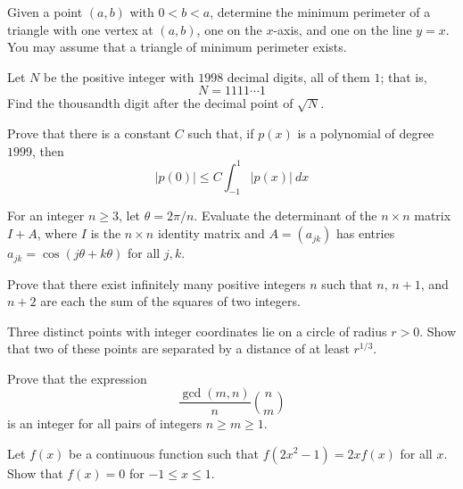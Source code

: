 \documentclass[12pt]{article}
\begin{document}
    \begin{exercise}[1998 B2]
        Given a point $(a, b)$ with $0 < b < a$, determine the minimum perimeter of a triangle with one vertex at $(a, b)$, one on the $x$-axis, and one on the line $y = x$. You may assume that a triangle of minimum perimeter exists.
    \end{exercise}

    \begin{exercise}[1998 B5]
        Let $N$ be the positive integer with $1998$ decimal digits, all of them $1$; that is, \[N=1111\cdots 1\] Find the thousandth digit after the decimal point of $\sqrt{N}$.
    \end{exercise}

    \begin{exercise}[1999 A5]
        Prove that there is a constant $C$ such that, if $p(x)$ is a polynomial of degree $1999$, then
        \[|p(0)|\leqslant C\int_{-1}^1 |p(x)|\ dx\]
    \end{exercise}

    \begin{exercise}[1999 B5]
        For an integer $n\geqslant 3$, let $\theta = 2\pi / n$. Evaluate the determinant of the $n\times n$ matrix $I+A$, where $I$ is the $n\times n$ identity matrix and $A=(a_{jk})$ has entries $a_{jk} = \cos(j\theta+k\theta)$ for all $j,k$. 
    \end{exercise}

    \begin{exercise}[2000 A2]
        Prove that there exist infinitely many positive integers \(n\) such that \(n\), \(n+1\), and \(n+2\) are each the sum of the squares of two integers.
    \end{exercise}

    \begin{exercise}[2000 A5]
        Three distinct points with integer coordinates lie on a circle of radius $r>0$. Show that two of these points are separated by a distance of at least $r^{1/3}$.
    \end{exercise}

    \begin{exercise}[2000 B2]
        Prove that the expression
        \[\frac{\gcd(m,n)}{n}\binom{n}{m}\]
        is an integer for all pairs of integers \(n\geq m\geq 1\).
    \end{exercise}

    \begin{exercise}[2000 B4]
        Let $f(x)$ be a continuous function such that $f(2x^{2} - 1) = 2xf(x)$ for all $x$. Show that $f(x) = 0$ for $-1 \leq x \leq 1$. 
    \end{exercise}
\end{document}
